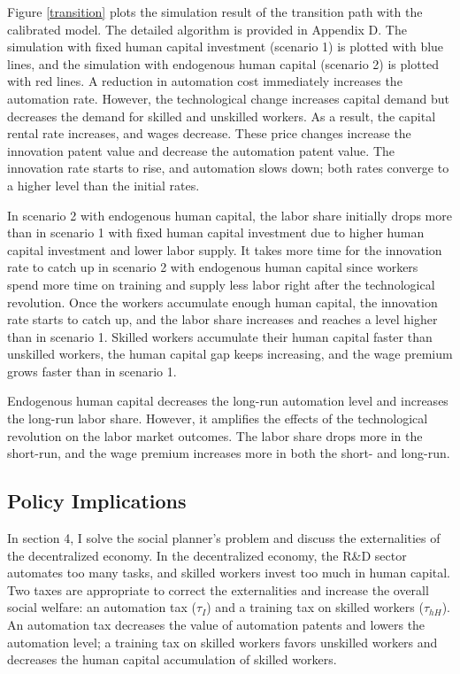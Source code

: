 \documentclass[12pt]{article}
\begin{document}
Figure \ref{transition} plots the simulation result of the transition path with the calibrated model. The detailed algorithm is provided in Appendix D. The simulation with fixed human capital investment (scenario 1) is plotted with blue lines, and the simulation with endogenous human capital (scenario 2) is plotted with red lines. A reduction in automation cost immediately increases the automation rate. However, the technological change increases capital demand but decreases the demand for skilled and unskilled workers. As a result, the capital rental rate increases, and wages decrease. These price changes increase the innovation patent value and decrease the automation patent value. The innovation rate starts to rise, and automation slows down; both rates converge to a higher level than the initial rates. 

In scenario 2 with endogenous human capital, the labor share initially drops more than in scenario 1 with fixed human capital investment due to higher human capital investment and lower labor supply. It takes more time for the innovation rate to catch up in scenario 2 with endogenous human capital since workers spend more time on training and supply less labor right after the technological revolution. Once the workers accumulate enough human capital, the innovation rate starts to catch up, and the labor share increases and reaches a level higher than in scenario 1. Skilled workers accumulate their human capital faster than unskilled workers, the human capital gap keeps increasing, and the wage premium grows faster than in scenario 1.

Endogenous human capital decreases the long-run automation level and increases the long-run labor share. However, it amplifies the effects of the technological revolution on the labor market outcomes. The labor share drops more in the short-run, and the wage premium increases more in both the short- and long-run. 

\subsection{Policy Implications}
In section 4, I solve the social planner's problem and discuss the externalities of the decentralized economy. In the decentralized economy, the R\&D sector automates too many tasks, and skilled workers invest too much in human capital. Two taxes are appropriate to correct the externalities and increase the overall social welfare: an automation tax ($\tau_I$) and a training tax on skilled workers ($\tau_{hH}$). An automation tax decreases the value of automation patents and lowers the automation level; a training tax on skilled workers favors unskilled workers and decreases the human capital accumulation of skilled workers. 
\end{document}

